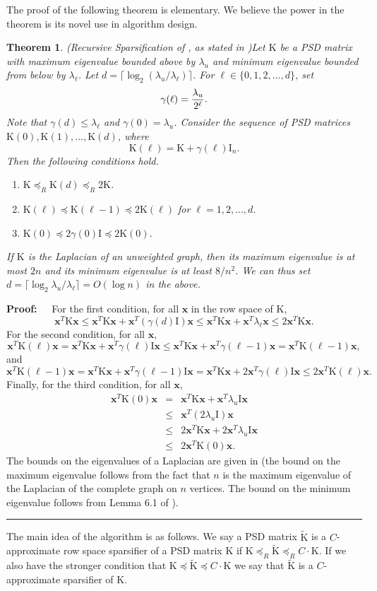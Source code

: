 \documentclass[11pt]{article}
\newtheorem{theorem}{Theorem}
\newenvironment{proof}{\begin{trivlist} \item {\bf Proof:~~}}
  {\qed\end{trivlist}}
\newcommand{\mat}[1]{{\ensuremath{\bm{\mathrm{#1}}}}}
\def\matI{\mat{I}}
\def\matK{\mat{K}}
\def\frac#1#2{{#1\over #2}}
\def\qed{\hfill\rule{2mm}{2mm}}
\def\x{{\mathbf x}}
\begin{document}
The proof of the following
theorem is elementary. We believe the power in the theorem is its novel
use in algorithm design. 

\begin{theorem}(Recursive Sparsification of \cite{lmp13}, as stated in \cite{KLMMS14})\label{thm:mp}
Let $\matK$ be a PSD matrix with maximum eigenvalue bounded above by $\lambda_u$ and minimum eigenvalue bounded from
below by $\lambda_{\ell}$. Let $d = \lceil \log_2 (\lambda_u/\lambda_{\ell}) \rceil$. For $\ell \in \{0, 1, 2, \ldots, d\}$, set
$$\gamma(\ell) = \frac{\lambda_u}{2^{\ell}}.$$
Note that $\gamma(d) \leq \lambda_{\ell}$ and $\gamma(0) = \lambda_u$. Consider the sequence of PSD matrices
$\matK(0), \matK(1), \ldots, \matK(d)$, where
$$\matK(\ell) = \matK + \gamma(\ell) \matI_{n}.$$
Then the following conditions hold.
\begin{enumerate}
\item $\matK \preceq_R \matK(d) \preceq_R 2\matK$.
\item $\matK(\ell) \preceq \matK(\ell-1) \preceq 2\matK(\ell)$ for $\ell = 1, 2, \ldots, d$. 
\item $\matK(0) \preceq 2 \gamma(0)\matI \preceq 2\matK(0)$.
\end{enumerate}
If $\matK$ is the Laplacian of an unweighted graph, then its maximum eigenvalue is at most $2n$ and its minimum
eigenvalue is at least $8/n^2$. We can thus set $d = \lceil \log_2 \lambda_u/\lambda_{\ell} \rceil  = O(\log n)$
in the above. 
\end{theorem}
\begin{proof}
For the first condition, for all $\x$ in the row space of $\matK$, 
$$\x^T \matK \x \leq \x^T \matK \x + \x^T (\gamma(d) \matI )\x \leq \x^T \matK \x + \x^T \lambda_{\ell} \x \leq 2 \x^T \matK \x.$$
For the second condition, for all $\x$,
$$\x^T \matK(\ell) \x = \x^T \matK \x + \x^T \gamma(\ell) \matI \x \leq \x^T \matK \x + \x^T \gamma(\ell-1) \x = \x^T \matK(\ell-1)\x,$$
and
$$\x^T \matK(\ell-1)\x = \x^T \matK \x + \x^T \gamma(\ell-1) \matI \x = \x^T \matK \x + 2 \x^T \gamma(\ell) \matI \x \leq 2 \x^T\matK(\ell)\x.$$
Finally, for the third condition, for all $\x$,
\begin{eqnarray*}
\x^T \matK(0) \x & = & \x^T \matK \x + \x^T \lambda_u \matI \x\\
& \leq & \x^T (2\lambda_u \matI) \x\\
& \leq & 2\x^T \matK \x + 2 \x^T \lambda_u \matI \x\\
& \leq & 2\x^T \matK(0) \x.
\end{eqnarray*} 
The bounds on the eigenvalues of a Laplacian are given in \cite{st04} (the bound on the maximum eigenvalue follows from
the fact that $n$ is the maximum eigenvalue of the Laplacian of the complete graph on $n$ vertices. The bound on the minimum
eigenvalue follows from Lemma 6.1 of \cite{st04}). 
\end{proof}
The main idea of the algorithm is as follows. We say a PSD matrix $\tilde{\matK}$ is a $C$-approximate 
row space sparsifier of a PSD matrix $\matK$ if $\matK \preceq_R \tilde{\matK} \preceq_R C \cdot \matK$. If we also
have the stronger condition that $\matK \preceq \tilde{\matK} \preceq C \cdot \matK$ we say that $\tilde{\matK}$
is a $C$-approximate sparsifier of $\matK$. 
\end{document}

